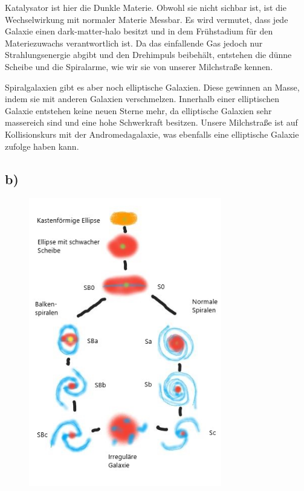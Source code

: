     \justifying Katalysator ist hier die Dunkle Materie. Obwohl sie nicht sichbar ist, ist die Wechselwirkung mit normaler Materie Messbar. Es wird vermutet, 
    dass jede Galaxie einen dark-matter-halo besitzt und in dem Frühstadium für den Materiezuwachs verantwortlich ist. Da das einfallende Gas
    jedoch nur Strahlungsenergie abgibt und den Drehimpuls beibehält, entstehen die dünne Scheibe und die Spiralarme, wie wir sie von unserer
    Milchstraße kennen. 

    \justifying Spiralgalaxien gibt es aber noch elliptische Galaxien. Diese gewinnen an Masse, indem sie mit anderen Galaxien verschmelzen. Innerhalb
    einer elliptischen Galaxie entstehen keine neuen Sterne mehr, da elliptische Galaxien sehr massereich sind und eine hohe Schwerkraft besitzen. 
    Unsere Milchstraße ist auf Kollisionskurs mit der Andromedagalaxie, was ebenfalls eine elliptische Galaxie zufolge haben kann.

\subsection{b)}

\begin{figure}[H]
    \centering
    \includegraphics[width=0.75\textwidth]{images/Aufgabe8b_skizze.jpg}
    \label{fig:4}
\end{figure}

